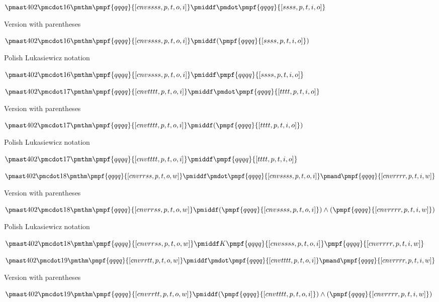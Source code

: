 \documentclass[12pt]{article}
\begin{document}
$\pmast 402 \pmcdot 16 \pmthm \pmpf{qqqq}{[cnvssss, p, t, o, i]} \pmiddf \pmdot \pmpf{qqqq}{[ssss, p, t, i, o]} $
 
 

Version with parentheses

$\pmast 402 \pmcdot 16 \pmthm \pmpf{qqqq}{[cnvssss, p, t, o, i]} \pmiddf  (  \pmpf{qqqq}{[ssss, p, t, i, o]} )$


Polish Lukasiewicz notation

$\pmast 402 \pmcdot 16 \pmthm \pmpf{qqqq}{[cnvssss,   p,   t,   o,   i]}   \pmiddf    \pmpf{qqqq}{[ssss,   p,   t,   i,   o]}  $


$\pmast 402 \pmcdot 17 \pmthm \pmpf{qqqq}{[cnvtttt, p, t, o, i]} \pmiddf \pmdot \pmpf{qqqq}{[tttt, p, t, i, o]} $
 
 

Version with parentheses

$\pmast 402 \pmcdot 17 \pmthm \pmpf{qqqq}{[cnvtttt, p, t, o, i]} \pmiddf  (  \pmpf{qqqq}{[tttt, p, t, i, o]} )$


Polish Lukasiewicz notation

$\pmast 402 \pmcdot 17 \pmthm \pmpf{qqqq}{[cnvtttt,   p,   t,   o,   i]}   \pmiddf    \pmpf{qqqq}{[tttt,   p,   t,   i,   o]}  $


$\pmast 402 \pmcdot 18 \pmthm \pmpf{qqqq}{[cnvrrss, p, t, o, w]} \pmiddf \pmdot \pmpf{qqqq}{[cnvssss, p, t, o, i]} \pmand \pmpf{qqqq}{[cnvrrrr, p, t, i, w]} $
 
 

Version with parentheses

$\pmast 402 \pmcdot 18 \pmthm \pmpf{qqqq}{[cnvrrss, p, t, o, w]} \pmiddf  (  \pmpf{qqqq}{[cnvssss, p, t, o, i]} ) \land ( \pmpf{qqqq}{[cnvrrrr, p, t, i, w]} )$


Polish Lukasiewicz notation

$\pmast 402 \pmcdot 18 \pmthm \pmpf{qqqq}{[cnvrrss,   p,   t,   o,   w]}   \pmiddf     K   \pmpf{qqqq}{[cnvssss,   p,   t,   o,   i]}   \pmpf{qqqq}{[cnvrrrr,   p,   t,   i,   w]}  $


$\pmast 402 \pmcdot 19 \pmthm \pmpf{qqqq}{[cnvrrtt, p, t, o, w]} \pmiddf \pmdot \pmpf{qqqq}{[cnvtttt, p, t, o, i]} \pmand \pmpf{qqqq}{[cnvrrrr, p, t, i, w]} $
 
 

Version with parentheses

$\pmast 402 \pmcdot 19 \pmthm \pmpf{qqqq}{[cnvrrtt, p, t, o, w]} \pmiddf  (  \pmpf{qqqq}{[cnvtttt, p, t, o, i]} ) \land ( \pmpf{qqqq}{[cnvrrrr, p, t, i, w]} )$
\end{document}
